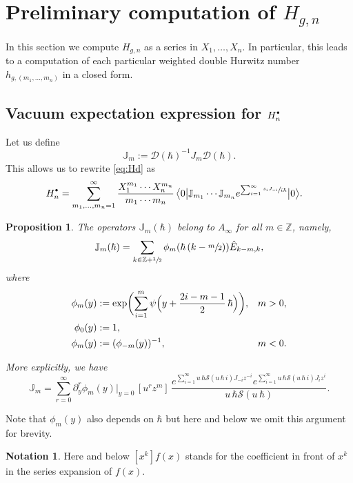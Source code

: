 \documentclass[JEP,XML,SOM,Unicode,NoEqCountersInSection,NoFloatCountersInSection]{cedram}
\let\mathcal\mathscr
\newcommand{\sbullet}{{\scriptscriptstyle\bullet}}
\newcommand{\csbullet}{{\raisebox{1pt}{$\sbullet$}}}
\theoremstyle{plain}
\newtheorem{proposition}[theorem]{Proposition}
\theoremstyle{definition}
\newtheorem{notation}[theorem]{Notation}
\theoremstyle{remark}
\newcommand{\Z}{\mathbb{Z}}
\newcommand{\cD}{\mathcal{D}}
\newcommand{\cS}{\mathcal{S}}
\newcommand{\VEV}[1]{{\bigl\langle 0 \big| {#1} \big| 0 \bigr\rangle}}
\newcommand{\Hd}{H^\csbullet}
\newcommand{\euro}{\mathbb{J}}
\begin{document}
\section{Preliminary computation of \texorpdfstring{$H_{g,n}$}{Hgn}} \label{sec:preliminary}

In this section we compute $H_{g,n}$ as a series in $X_1,\dots,X_n$. In particular, this leads to a computation of each particular weighted double Hurwitz number $h_{g,(m_1,\dots,m_n)}$ in a closed form.

\subsection{Vacuum expectation expression for \texorpdfstring{$\Hd_n$}{Hn disconnected}}
Let us define
\begin{equation*}
\euro_m:=\cD(\hbar)^{-1}J_{m}\cD(\hbar).
\end{equation*}
This allows us to rewrite \eqref{eq:Hd} as
\begin{align}\label{eq:Hdisc1}
\Hd_n
&=\sum_{m_1,\dots,m_n=1}^\infty
\frac{X_1^{m_1}\cdots X_n^{m_n}}{m_1\cdots m_n}\,
\VEV{\euro_{m_1}\cdots \euro_{m_n}e^{\sum_{i=1}^\infty \sfrac{s_i J_{-i}}{i\hbar} }}.
\end{align}

\begin{proposition}\label{prop:OperJJ}
The operators $\euro_m(\hbar)$ belong to $A_\infty$ for all $m\in\Z$, namely,
\begin{equation}\label{eq:DJD}
\euro_m(\hbar) =\sum_{k\in\Z+\sfrac{1}{2}}\phi_m(\hbar\,(k-\sfrac m2))\hat E_{k-m,k},
\end{equation}
where
\begin{align}\label{eq:phimdef}
\phi_m(y)
&:=\exp\biggl(\sum_{i=1}^{m}\psi\Bigl(y+\dfrac{2i-m-1}{2}\, \hbar\Bigr)\biggr),&m>0,\\ \label{eq:phi0def}
\phi_0(y)&:=1,&\\
\notag\phi_m(y)&:=(\phi_{-m}(y))^{-1},&m<0.
\end{align}

More explicitly, we have
\begin{equation}\label{eq:euroJ}
\euro_m = \sum_{r=0}^\infty\partial_y^r\phi_m(y)\big|_{y=0}\,[u^rz^m]\,
\frac{
e^{\sum_{i=1}^\infty u\,\hbar\cS(u\,\hbar\,i) J_{-i}z^{-i}}
e^{\sum_{i=1}^\infty u\,\hbar \cS(u\,\hbar\,i) J_{i}z^{i}}}
{u\,\hbar\cS(u\,\hbar)}.
\end{equation}
\end{proposition}
\noindent Note that $\phi_m(y)$ also depends on $\hbar$ but here and below we omit this argument for brevity.
\begin{notation}
Here and below $[x^k]f(x)$ stands for the coefficient in front of $x^k$ in the series expansion of $f(x)$.
\end{notation}
\end{document}
